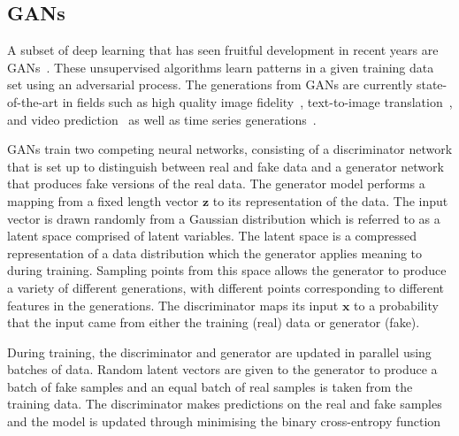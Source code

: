 \documentclass[12pt]{iopart}
\begin{document}
\subsection{GANs}
%
%
A subset of deep learning that has seen fruitful development in recent years
are \acp{GAN}~\cite{Goodfellow2014}. These unsupervised algorithms learn patterns in a
given training data set using an adversarial process. The generations from
\acp{GAN} are currently state-of-the-art in fields such as high quality image
fidelity~\cite{brock2018large,karras2019analyzing}, text-to-image
translation~\cite{reed2016generative}, and video
prediction~\cite{liang2017dual} as well as time series
generations~\cite{esteban2017realvalued}.

%
\acp{GAN} train two competing neural networks, consisting of a discriminator
network that is set up to distinguish between real and fake data and a
generator network that produces fake versions of the real data. The generator model performs a mapping from a fixed length vector $\mathbf{z}$ to its
representation of the data. The input vector is drawn randomly from a Gaussian distribution which is referred to as a latent space comprised of latent variables. The latent space is a compressed representation of a data distribution which the generator applies meaning to during training. Sampling points from this space allows the generator to produce a variety of different generations, with different points corresponding to different features in the generations. The discriminator maps its input $\mathbf{x}$ to a probability that the input came from either the training (real) data or
generator (fake).

%
During training, the discriminator and generator are updated in parallel using batches of data. Random latent vectors are given to the generator to produce a batch of fake samples and an equal batch of real samples is taken from the training data. The discriminator makes predictions on the real and fake samples and the model is updated through minimising the binary cross-entropy function \cite{Goodfellow-et-al-2016}
\end{document}

